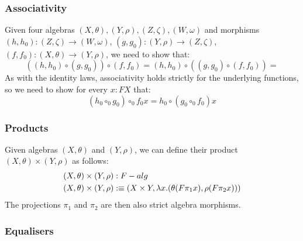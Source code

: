 \documentclass[a4paper,10pt]{article}
\begin{document}
\subsubsection{Associativity}

Given four algebras $(X,\theta), (Y,\rho), (Z,\zeta), (W,\omega)$ and
morphisms $(h,h_0) : (Z,\zeta) \to (W,\omega)$,
$(g,g_0) : (Y,\rho) \to (Z,\zeta)$,
$(f,f_0) : (X,\theta) \to (Y,\rho)$, we need to show that:
$$
((h,h_0) \circ (g,g_0)) \circ (f,f_0) = (h,h_0) \circ ((g,g_0) \circ (f,f_0)) = 
$$
As with the identity laws, associativity holds strictly for the
underlying functions, so we need to show for every $x : FX$ that:
$$
(h_0 \circ_0 g_0) \circ_0 f_0 x = h_0 \circ (g_0 \circ_0 f_0) x
$$


\subsubsection{Products}

Given algebras $(X,\theta)$ and $(Y,\rho)$, we can define their
product $(X,\theta) \times (Y,\rho)$ as follows:
%
\begin{align*}
  &(X,\theta) \times (Y,\rho) : F-alg\\
  &(X,\theta) \times (Y,\rho) :\equiv (X \times Y , \lambda x . (\theta (F \pi_1 x) , \rho (F \pi_2 x)))
\end{align*}
%
The projections $\pi_1$ and $\pi_2$ are then also strict algebra morphisms.

\subsubsection{Equalisers}
\end{document}
